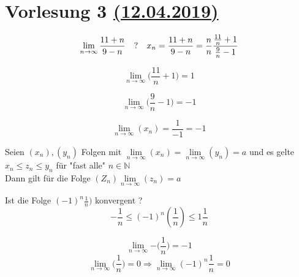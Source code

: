 \section{Vorlesung 3 \href{https://tu-dresden.de/mn/math/algebra/das-institut/beschaeftigte/antje-noack/ressourcen/dateien/v120-1/MathMethInf03.pdf?lang=en}{(12.04.2019)}}

\begin{example}

\end{example}
\begin{equation}
    \lim\limits_{n \rightarrow \infty}{\frac{11+n}{9-n}}\quad ? \\
    \\\quad x_n = \frac{11+n}{9-n}=\frac{n}{n} \frac{\frac{11}{n}+1}{\frac{9}{n}-1}
\end{equation}

\begin{equation}
    \lim\limits_{n \rightarrow \infty}{\bigg(\frac{11}{n}+1\bigg)}=1
\end{equation}

\begin{equation}
    \lim\limits_{n \rightarrow \infty}{\bigg(\frac{9}{n}-1\bigg)}=-1
\end{equation}

\begin{equation}
    \lim\limits_{n \rightarrow \infty}{(x_n)}= \frac{1}{-1}=-1
\end{equation}

\begin{lemma}[Quetschlemma]
    Seien $(x_n),(y_n)$ Folgen mit $\lim\limits_{n \rightarrow \infty}{(x_n)}= \lim\limits_{n \rightarrow \infty}{(y_n)}= a$ und es gelte
    $x_n \leq z_n \leq y_n$ für "fast alle"  $n \in \mathbb{N}$\\

    Dann gilt für die Folge $(Z_n) \lim\limits_{n \rightarrow \infty}{(z_n)}=a$
\end{lemma}

\begin{example}
    Ist die Folge $(-1)^n\frac{1}{n})$ konvergent ?\\

    \[ - \frac{1}{n} \leq(-1)^n(\frac{1}{n}) \leq 1 \frac{1}{n}\]

    \[ \lim\limits_{n \rightarrow \infty}{- \big(\frac{1}{n} \big)}= -1 \]
    \[ \lim\limits_{n \rightarrow \infty}{ \big(\frac{1}{n} \big)}= 0 \Rightarrow \lim\limits_{n \rightarrow \infty}{(-1)^n \frac{1}{n}}= 0
    \]
\end{example}

